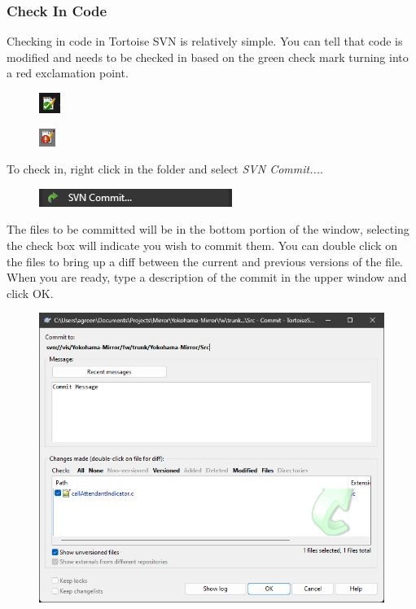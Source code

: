 \documentclass[10pt]{article}
\begin{document}
            \subsubsection{Check In Code}
                Checking in code in Tortoise SVN is relatively simple. You can tell that code is modified and needs to be checked in based on the green check mark turning into a red exclamation point.
                \begin{figure}[H]
                    \centerline{\includegraphics{References/Check.png}}
                \end{figure}
                \begin{figure}[H]
                    \centerline{\includegraphics{References/X.png}}
                \end{figure}
                To check in, right click in the folder and select \emph{SVN Commit...}.
                \begin{figure}[H]
                    \centerline{\includegraphics{References/SVN Commit.png}}
                \end{figure}
                The files to be committed will be in the bottom portion of the window, selecting the check box will indicate you wish to commit them. You can double click on the files to bring up a diff between the current and previous versions of the file. When you are ready, type a description of the commit in the upper window and click OK.
                \begin{figure}[H]
                    \centerline{\includegraphics[width=\textwidth]{References/SVN Commit Window.png}}
                \end{figure}
\end{document}
